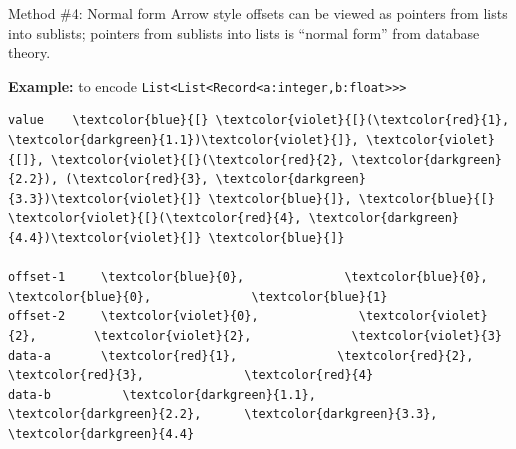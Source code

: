 \documentclass{beamer}
\begin{document}
\begin{frame}[fragile]{Method \#4: Normal form}
\vspace{0.5 cm}
Arrow style offsets can be viewed as pointers from lists into sublists; pointers from sublists into lists is ``normal form'' from database theory.

\vspace{0.35 cm}
{\bf Example:} to encode {\tt\footnotesize List<List<Record<a:integer,b:float>>>}

\scriptsize\bf
\begin{Verbatim}[commandchars=\\\{\}]
value    \textcolor{blue}{[} \textcolor{violet}{[}(\textcolor{red}{1}, \textcolor{darkgreen}{1.1})\textcolor{violet}{]}, \textcolor{violet}{[]}, \textcolor{violet}{[}(\textcolor{red}{2}, \textcolor{darkgreen}{2.2}), (\textcolor{red}{3}, \textcolor{darkgreen}{3.3})\textcolor{violet}{]} \textcolor{blue}{]}, \textcolor{blue}{[} \textcolor{violet}{[}(\textcolor{red}{4}, \textcolor{darkgreen}{4.4})\textcolor{violet}{]} \textcolor{blue}{]}

offset-1     \textcolor{blue}{0},              \textcolor{blue}{0},        \textcolor{blue}{0},              \textcolor{blue}{1}
offset-2     \textcolor{violet}{0},              \textcolor{violet}{2},        \textcolor{violet}{2},              \textcolor{violet}{3}
data-a       \textcolor{red}{1},              \textcolor{red}{2},        \textcolor{red}{3},              \textcolor{red}{4}
data-b          \textcolor{darkgreen}{1.1},            \textcolor{darkgreen}{2.2},      \textcolor{darkgreen}{3.3},            \textcolor{darkgreen}{4.4}
\end{Verbatim}

\vspace{0.35 cm}\normalsize\sf
{}

\vspace{0.35 cm}
\end{frame}
\end{document}

